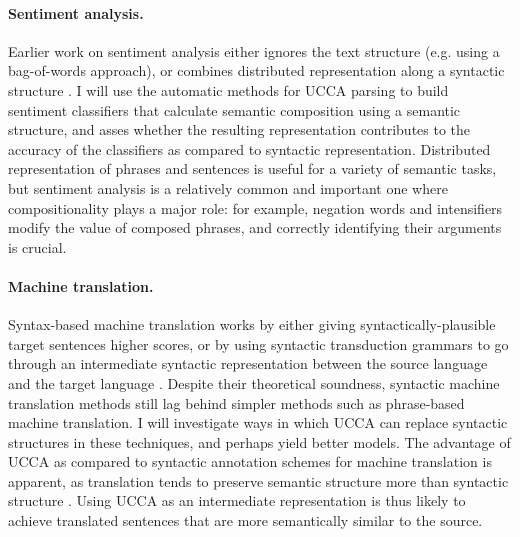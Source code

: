 \documentclass[12pt]{article}
\begin{document}
\paragraph{Sentiment analysis.}
Earlier work on sentiment analysis either ignores the text structure (e.g. using a bag-of-words approach), or
combines distributed representation along a syntactic structure \cite{socher2013recursive}.
I will use the automatic methods for UCCA parsing to build sentiment classifiers that calculate semantic composition
using a semantic structure, and asses whether the resulting representation contributes to the accuracy of the
classifiers as compared to syntactic representation.
Distributed representation of phrases and sentences is useful for a variety of semantic tasks,
but sentiment analysis is a relatively common and important one where compositionality plays a major role:
for example, negation words and intensifiers modify the value of composed phrases, and correctly identifying
their arguments is crucial.


\paragraph{Machine translation.}
Syntax-based machine translation works by either giving syntactically-plausible target sentences higher scores,
or by using syntactic transduction grammars to go through an intermediate syntactic representation between
the source language and the target language \cite{nadejde2013edinburgh}.
Despite their theoretical soundness, syntactic machine translation methods still lag behind simpler methods
such as phrase-based machine translation.
I will investigate ways in which UCCA can replace syntactic structures in these techniques, and perhaps
yield better models.
The advantage of UCCA as compared to syntactic annotation schemes for machine translation is apparent,
as translation tends to preserve semantic structure more than syntactic structure \cite{sulem2015conceptual}.
Using UCCA as an intermediate representation is thus likely to achieve translated sentences that are more
semantically similar to the source.





\end{document}
